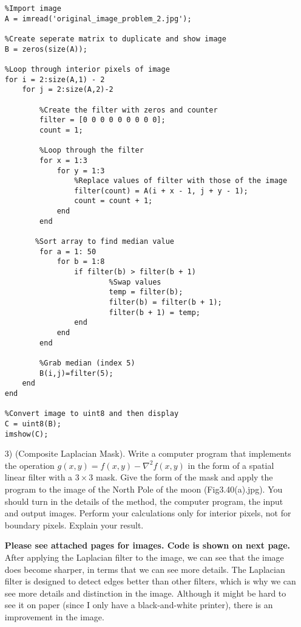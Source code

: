 \documentclass{article}
\begin{document}
\begin{enumerate}
\newpage

\begin{lstlisting}
%Import image
A = imread('original_image_problem_2.jpg');

%Create seperate matrix to duplicate and show image
B = zeros(size(A));

%Loop through interior pixels of image
for i = 2:size(A,1) - 2
    for j = 2:size(A,2)-2
        
        %Create the filter with zeros and counter
        filter = [0 0 0 0 0 0 0 0 0];
        count = 1;
        
        %Loop through the filter
        for x = 1:3
            for y = 1:3
                %Replace values of filter with those of the image
                filter(count) = A(i + x - 1, j + y - 1);
                count = count + 1;
            end
        end
        
	   %Sort array to find median value
        for a = 1: 50
            for b = 1:8
                if filter(b) > filter(b + 1)
					    %Swap values
                        temp = filter(b);
                        filter(b) = filter(b + 1);
                        filter(b + 1) = temp;
                end
            end
        end
        
        %Grab median (index 5)
        B(i,j)=filter(5);
    end
end

%Convert image to uint8 and then display
C = uint8(B);
imshow(C);
\end{lstlisting}

\item [3)] (Composite Laplacian Mask). Write a computer program that implements the operation $g(x,y) = f(x,y) - \nabla ^ 2 f(x,y)$ in the 
form of a spatial linear filter with a $3 \times 3$ mask. Give the form of the mask and apply the program to the image of the North Pole of the moon
(Fig3.40(a).jpg). You should turn in the details of the method, the computer program, the input and output images. Perform your calculations
only for interior pixels, not for boundary pixels. Explain your result.

\textbf{Please see attached pages for images. Code is shown on next page.} \vspace{0.1in}\newline
After applying the Laplacian filter to the image, we can see that the image does become sharper, in terms that we can see more details. The Laplacian filter is designed to
detect edges better than other filters, which is why we can see more details and distinction in the image.
Although it might be hard to see it on paper (since I only have a black-and-white printer), there is an improvement in the image.  


\end{enumerate}
\end{document}
